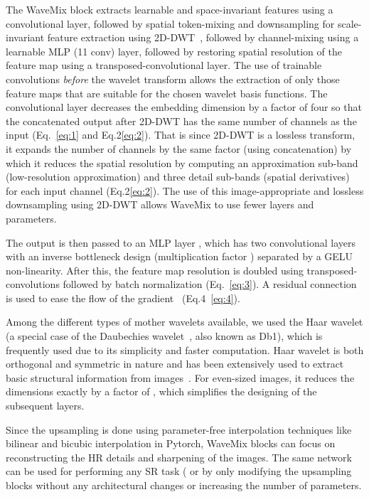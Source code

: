 \documentclass{article}
\begin{document}
The WaveMix block extracts learnable and space-invariant features using a convolutional layer, followed by spatial token-mixing and downsampling for scale-invariant feature extraction using 2D-DWT~\cite{pyTorchWavelets}, followed by channel-mixing using a learnable MLP (11 conv) layer, followed by restoring spatial resolution of the feature map using a transposed-convolutional layer. The use of trainable convolutions \emph{before} the wavelet transform allows the extraction of only those feature maps that are suitable for the chosen wavelet basis functions. The convolutional layer  decreases the embedding dimension   by a factor of four so that the concatenated output  after 2D-DWT has the same number of channels as the input  (Eq.~\ref{eq:1} and Eq.2\ref{eq:2}). That is since 2D-DWT is a lossless transform, it expands the number of channels by the same factor (using concatenation) by which it reduces the spatial resolution by computing an approximation sub-band (low-resolution approximation) and three detail sub-bands (spatial derivatives)~\cite{57199} for each input channel (Eq.2\ref{eq:2}). The use of this image-appropriate and lossless downsampling using 2D-DWT allows WaveMix to use fewer layers and parameters.

The output  is then passed to an MLP layer , which has two  convolutional layers with an inverse bottleneck design (multiplication factor ) separated by a GELU non-linearity. After this, the feature map resolution is doubled using transposed-convolutions  followed by batch normalization  (Eq.~\ref{eq:3}). A residual connection is used to ease the flow of the gradient~\cite{he2015deep} (Eq.4~\ref{eq:4}). 


Among the different types of mother wavelets available, we used the Haar wavelet (a special case of the Daubechies wavelet~\cite{57199}, also known as Db1), which is frequently used due to its simplicity and faster computation. Haar wavelet is both orthogonal and symmetric in nature and has been extensively used to extract basic structural information from images~\cite{Porwik2004TheHT}. For even-sized images, it reduces the dimensions exactly by a factor of , which simplifies the designing of the subsequent layers.

Since the upsampling is done using parameter-free interpolation techniques like bilinear and bicubic interpolation in Pytorch, WaveMix blocks can focus on reconstructing the HR details and sharpening of the images. The same network can be used for performing any SR task ( or  by only modifying the upsampling blocks without any architectural changes or increasing the number of parameters.
\end{document}
